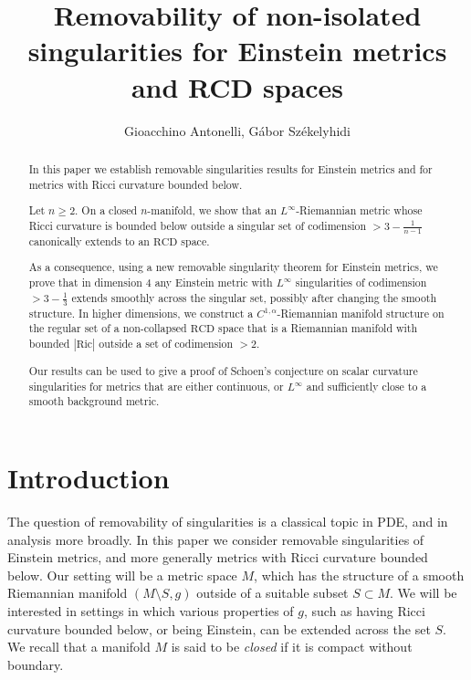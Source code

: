 \documentclass[12pt,a4paper,reqno]{amsart}
\title[Removability and RCD]{Removability of non-isolated singularities for Einstein metrics and RCD spaces}
\author{Gioacchino Antonelli, Gábor Székelyhidi}
\renewcommand{\geq}{\geqslant}
\begin{document}
\begin{abstract}
    In this paper we establish removable singularities results for Einstein metrics and for metrics with Ricci curvature bounded below.

Let $n\geq 2$. On a closed $n$-manifold, we show that an $L^\infty$-Riemannian metric whose Ricci curvature is bounded below outside a singular set of codimension $> 3- \frac{1}{n-1}$ canonically extends to an $\mathrm{RCD}$ space.

As a consequence, using a new removable singularity theorem for Einstein metrics, we prove that in dimension $4$ any Einstein metric with $L^\infty$ singularities of codimension $>3-\frac{1}{3}$ extends smoothly across the singular set, possibly after changing the smooth structure. 
In higher dimensions, we construct a $C^{1,\alpha}$-Riemannian manifold structure on the regular set of a non-collapsed $\mathrm{RCD}$ space that is a Riemannian manifold with bounded $|\mathrm{Ric}|$ outside a set of codimension $>2$. 

Our results can be used to give a proof of Schoen's conjecture on scalar curvature singularities for metrics that are either continuous, or $L^\infty$ and sufficiently close to a smooth background metric.

\end{abstract}
\maketitle


\vspace{12pt}

\tableofcontents

\section{Introduction}
The question of removability of singularities is a classical topic in PDE, and in analysis more broadly. In this paper we consider removable singularities of Einstein metrics, and more generally metrics with Ricci curvature bounded below. Our setting will be a metric space $M$, which has the structure of a smooth Riemannian manifold $(M \setminus S, g)$ outside of a suitable subset $S\subset M$. We will be interested in settings in which various properties of $g$, such as having Ricci curvature bounded below, or being Einstein, can be extended across the set $S$. We recall that a manifold $M$ is said to be \textit{closed} if it is compact without boundary.
\end{document}
